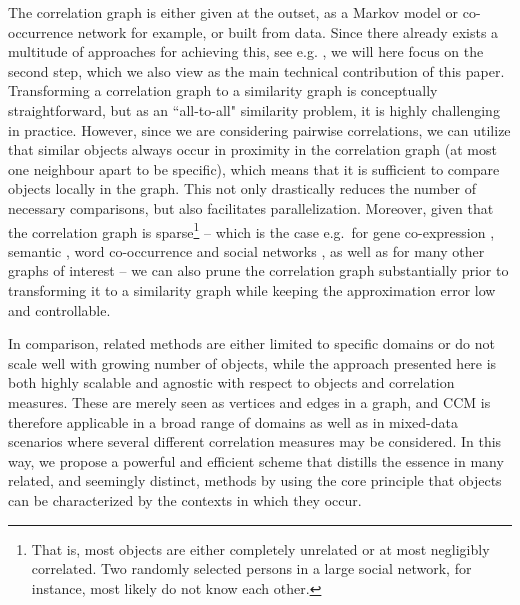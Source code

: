 \documentclass[conference]{IEEEtran}
\begin{document}
The correlation graph is either given at the outset, as a Markov model or co-occurrence network for example, or built from data.
Since there already exists a multitude of approaches for achieving this, see e.g. \cite{Albert2002}, we will here focus on the second 
step, which we also view as the main technical contribution of this paper. Transforming a correlation graph to a similarity graph 
is conceptually straightforward, but as an ``all-to-all" similarity
problem, it is highly challenging in practice. However, since we are considering
pairwise correlations, we can utilize that similar objects always occur in proximity in the correlation graph (at most one neighbour apart to 
be specific), which means that it is sufficient to compare objects locally in the graph. This not only drastically reduces the number 
of necessary comparisons,
but also facilitates parallelization. Moreover, given that the correlation graph is sparse\footnote{That is, most objects are 
either completely unrelated or at most negligibly correlated. Two randomly selected persons in a large social network, for 
instance, most likely do not know each other.} -- which is the case e.g.\ for gene co-expression \cite{Jordan2004}, semantic
 \cite{Steyvers2005}, word co-occurrence \cite{Cancho2001} and social networks \cite{mislove2007social}, as well as for 
 many other graphs of interest \cite{Albert2002} -- we can also prune the correlation graph substantially 
prior to transforming it to a similarity graph while keeping the approximation error low and controllable.

In comparison, related methods are either limited to specific domains 
or do not scale well with growing number of objects, while the approach presented here is both highly scalable and agnostic
with respect to objects and correlation measures. These are merely seen as vertices and edges in a graph, and CCM
is therefore applicable in a broad range of domains as well as in mixed-data scenarios where several different correlation measures
may be considered. In this way, we propose a powerful and efficient scheme that distills the essence in many related, and seemingly 
distinct, methods by using the core principle that objects can be characterized by the contexts in which they occur.
\end{document}
